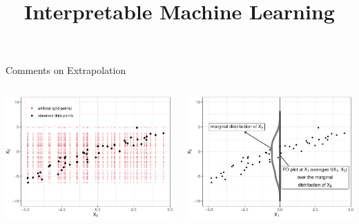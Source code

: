 \documentclass[11pt,compress,t,notes=noshow, aspectratio=169, xcolor=table]{beamer}
\title{Interpretable Machine Learning}
\date{}
\begin{document}
\newcommand{\titlefigure}{figure/pdp_bike}
\newcommand{\learninggoals}{
\item Extrapolation and Interactions in PDPs
\item Centered ICE and PDP
}


\begin{frame}{Comments on Extrapolation}

 
\begin{columns}[T, totalwidth=\textwidth]
\begin{column}{0.5\textwidth}
\centering
\includegraphics[width=\textwidth]{figure/ale_scatter_grid}
\end{column}
\begin{column}{0.5\textwidth}
\centering
\includegraphics[width=\textwidth]{figure/ale_pdplot}
\end{column}
\end{columns}


\end{frame}
\end{document}
